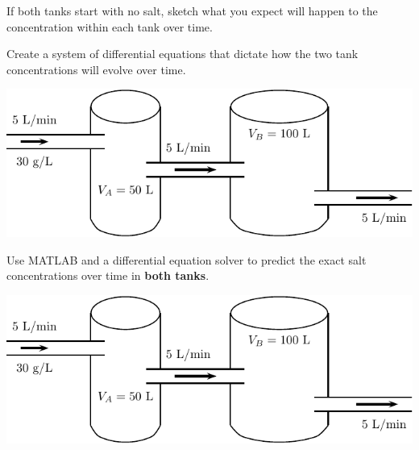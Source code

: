 \begin{problem}
  If both tanks start with no salt, sketch what you expect will happen
  to the concentration within each tank over time.
\end{problem}

\newpage
\begin{minipage}[h]{0.5\linewidth}
\vspace{0pt}
\begin{problem}
Create a system of differential equations that dictate 
how the two tank concentrations will evolve over time.
\end{problem}
\end{minipage} \hfill
\begin{minipage}[h]{0.45\linewidth}
\vspace{0pt}
\includegraphics[width=1.0\linewidth]{graphics/notes_09_tanks1}
\end{minipage}


\newpage
\begin{minipage}[t]{0.5\linewidth}
\vspace{0pt}
\problem
  Use MATLAB and a differential equation solver to predict the exact salt concentrations over time
in {\bf both tanks}. 
\end{minipage}
\begin{minipage}[t]{0.45\linewidth}
\vspace{0pt}
\includegraphics[width=1.0\linewidth]{graphics/notes_09_tanks1}
\end{minipage}

